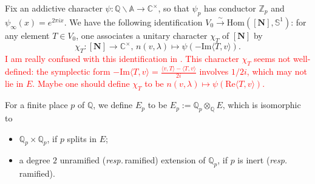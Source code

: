 \documentclass[12pt]{article}
\theoremstyle{remark}
\theoremstyle{definition}
\newcommand{\Hom}{\mathrm{Hom}}
\newcommand{\Z}{\mathbb{Z}}
\newcommand{\C}{\mathbb{C}}
\newcommand{\Q}{\mathbb{Q}}
\newcommand{\A}{\mathbb{A}}
\newcommand{\lrangle}[2]{\langle #1,#2\rangle}
\newcommand{\rmm}[1]{\mathrm{#1}}
\newcommand{\bff}[1]{\mathbf{#1}}
\newcommand{\mbb}[1]{\mathbb{#1}}
\begin{document}
Fix an addictive character $\psi:\Q\backslash\A\rightarrow \C^{\times}$,
so that $\psi_{p}$ has conductor $\Z_{p}$
and $\psi_{\infty}(x)=e^{2\pi i x}$.
We have the following identification $V_{0}\xrightarrow{\sim}\Hom([\bff{N}],\mbb{S}^{1})$:
for any element $T\in V_{0}$,
one associates a unitary character $\chi_{T}$ of $[\bff{N}]$ by 
\[\chi_{T}:[\bff{N}]\rightarrow \C^{\times},\,n(v,\lambda)\mapsto \psi(-\rmm{Im}\lrangle{T}{v}).\]
\textcolor{red}{I am really confused with this identification in \cite{Hilado_McGlade_Yan_Fourier_coefficients_unitary_group}. 
This character $\chi_{T}$ seems not well-defined:
the symplectic form $-\rmm{Im}\lrangle{T}{v}=\frac{\lrangle{v}{T}-\lrangle{T}{v}}{2i}$ involves $1/2i$, which may not lie in $E$.
Maybe one should define $\chi_{T}$ to be $n(v,\lambda)\mapsto \psi(\rmm{Re}\lrangle{T}{v})$.}

For a finite place $p$ of $\Q$,
we define $E_{p}$ to be $E_{p}:=\Q_{p}\otimes_{\Q}E$,
which is isomorphic to
\begin{itemize}
    \item $\Q_{p}\times \Q_{p}$, if $p$ splits in $E$;
    \item a degree $2$ unramified (\emph{resp.\,}ramified) extension of $\Q_{p}$, if $p$ is inert (\emph{resp.\,}ramified).
\end{itemize}
\end{document}
